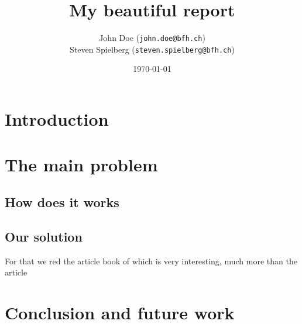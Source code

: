 \documentclass{scrartcl}
\begin{document}
\title{My beautiful report}
\date{\today}   %
\author{John Doe (\texttt{john.doe@bfh.ch}) \\
  Steven Spielberg (\texttt{steven.spielberg@bfh.ch})}
\maketitle
\tableofcontents
\clearpage

\section{Introduction}
\lipsum[1-5]

\section{The main problem}
\subsection{How does it works}

\lipsum[1-3]

\subsection{Our solution}
\lipsum[4-5]

For that we red the article book of \cite{Jerald:2015:VBH:2792790}
which is very interesting, much more than the article
\cite{Diniz:2017:UGO:3100317.3100324}

\section{Conclusion and future work}
\lipsum[6-7]


\printbibliography[heading=bibintoc]
\end{document}
